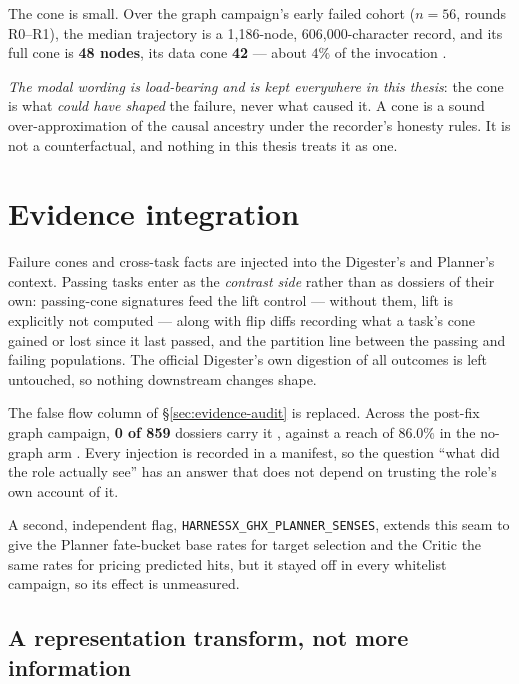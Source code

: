 The cone is small. Over the graph campaign's early failed cohort ($n{=}56$,
rounds R0--R1), the median trajectory is a 1{,}186-node, 606{,}000-character
record, and its full cone is \textbf{48 nodes}, its data cone \textbf{42}
--- about $4\%$ of the invocation .

\emph{The modal wording is load-bearing and is kept everywhere in this
thesis}: the cone is what \emph{could have shaped} the failure, never what
caused it. A cone is a sound over-approximation of the causal ancestry
under the recorder's honesty rules. It is not a counterfactual, and
nothing in this thesis treats it as one.

\section{Evidence integration}
\label{sec:evidence-integration}

Failure cones and cross-task facts are injected into the Digester's and
Planner's context. Passing tasks enter as the \emph{contrast side} rather
than as dossiers of their own: passing-cone signatures feed the lift
control --- without them, lift is explicitly not computed --- along with
flip diffs recording what a task's cone gained or lost since it last
passed, and the partition line between the passing and failing
populations. The official Digester's own digestion of all outcomes is left
untouched, so nothing downstream changes shape.

The false flow column of \S\ref{sec:evidence-audit} is replaced. Across the
post-fix graph campaign, \textbf{0 of 859} dossiers carry it , against
a reach of $86.0\%$ in the no-graph arm . Every injection is recorded
in a manifest, so the question ``what did the role actually see'' has an
answer that does not depend on trusting the role's own account of it.

A second, independent flag, \texttt{HARNESSX\_GHX\_PLANNER\_SENSES}, extends
this seam to give the Planner fate-bucket base rates for target selection
and the Critic the same rates for pricing predicted hits, but it stayed off
in every whitelist campaign, so its effect is unmeasured.

\subsection*{A representation transform, not more information}


